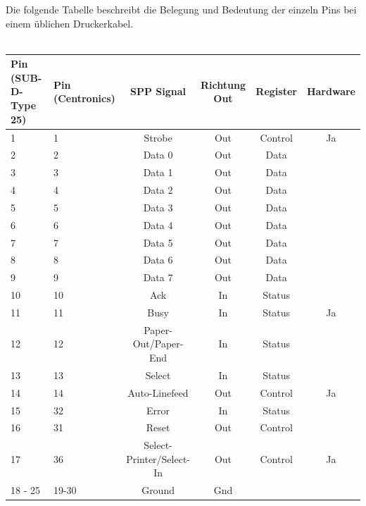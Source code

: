 \documentclass[a4paper,11pt]{article}
\begin{document}
 
 Die folgende Tabelle beschreibt die  Belegung und Bedeutung der einzeln Pins bei einem üblichen Druckerkabel. 
 \\ \\
 \begin{tabular}{|p{20mm}|p{20mm}|c|c|c|c|}
  \hline
	Pin (SUB-D-Type 25) & Pin (Centronics) & SPP Signal & Richtung Out & Register & Hardware\\ \hline
	1 & 1	& 	Strobe					& 	Out		&	Control	&	Ja	\\ \hline
	2 & 2	&	Data 0					&	Out		& 	Data		&     \\ \hline
	3 &	3	&	Data 1				&	Out		&	Data		&     \\ \hline
	4 &	4	&	Data 2				&	Out		&	Data		&     \\ \hline
	5 &	5	&	Data 3				&	Out		&	Data		&     \\ \hline
	6 &	6	&	Data 4				&	Out		&	Data		&     \\ \hline
	7 &	7	&	Data 5				&	Out		&	Data		&     \\ \hline
	8 &	8	&	Data 6				&	Out		&	Data		&     \\ \hline
	9 &	9	&	Data 7				&	Out		&	Data		&     \\ \hline
	10 & 10	&	Ack					&	In		&	Status	&	    \\ \hline
	11 & 11	&	Busy					&	In		&	Status	&	Ja  \\ \hline
	12 & 12	&	Paper-Out/Paper-End	&	In		&	Status	&	    \\ \hline
	13 & 13	&	Select				&	In		&	Status	&	    \\ \hline
	14 & 14	&	Auto-Linefeed			&	Out		&	Control	&	Ja  \\ \hline
	15 & 32	&	Error					&	In		&	Status	&	    \\ \hline
	16 & 31	&	Reset				&	Out		&	Control	&	    \\ \hline
	17 & 36	&	Select-Printer/Select-In	&	Out		&	Control	&	Ja  \\ \hline
	18 - 25	&	19-30				&	Ground	&	Gnd	&	&             \\ \hline
 \end{tabular}


 
\end{document}
